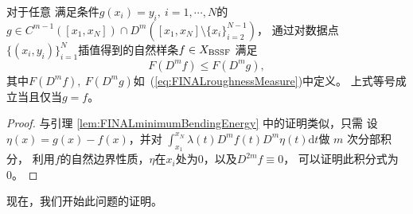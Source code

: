 \begin{lem}
  \label{lem:FINALminimumBendingEnergyForBSpline}
  对于任意
  满足条件$g(x_{i})=y_{i},\ i=1,\cdots,N$的$g\in C^{m-1}([x_{1},x_{N}])\cap
      D^{m}([x_{1},x_{N}]\setminus \{x_{i}\}_{i=2}^{N-1})$，
  通过对数据点
  $\{(x_{i},y_{i})\}_{i=1}^{N}$插值得到的自然样条$f\in X_{\textnormal{BSSF}}$
  满足
  \begin{equation}
    \label{eq:FINALminimumBendingEnergyForBSpline}
    F(D^{m}f)\le F(D^{m}g),
  \end{equation}
  其中$F(D^{m}f),\ F(D^{m}g)$如~(\ref{eq:FINALroughnessMeasure})中定义。
  上式等号成立当且仅当$g=f$。
\end{lem}
\begin{proof}
  与引理 \ref{lem:FINALminimumBendingEnergy} 中的证明类似，只需
  设$\eta(x)=g(x)-f(x)$，并对
  $\int_{x_{1}}^{x_{N}}\lambda(t) D^{m}f(t) D^{m}\eta(t) \mathrm{d}t$做 $m$ 次分部积分，
  利用$f$的自然边界性质，$\eta$在$x_{i}$处为0，以及$D^{2m}f\equiv 0$，
  可以证明此积分式为0。
\end{proof}

现在，我们开始此问题的证明。

